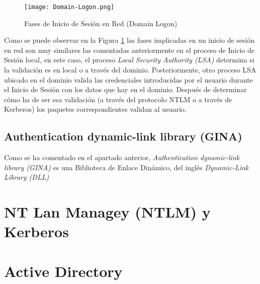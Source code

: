 \begin{figure}[t!] %
\begin{center}
\texttt{[image: Domain-Logon.png]}
\end{center}
\caption{Fases de Inicio de Sesión en Red (Domain Logon)}
\label{domain-logon}
\end{figure}
Como se puede observar en la Figura \ref{domain-logon} las fases implicadas en un inicio de sesión en red son muy similares las comentadas anteriormente en el proceso de Inicio de Sesión local, en este caso, el proceso {\it Local Security Authority (LSA)} determina si la validación es en local o a través del dominio. Posteriormente, otro proceso LSA ubicado en el dominio valida las credenciales introducidas por el usuario durante el Inicio de Sesión con los datos que hay en el dominio. Después de determinar cómo ha de ser esa validación (a través del protocolo NTLM o a través de Kerberos) los paquetes correspondientes validan al usuario.\\

\subsection{Authentication dynamic-link library (GINA)}

Como se ha comentado en el apartado anterior, {\it Authentication dynamic-link library (GINA)} es una Biblioteca de Enlace Dinámico, del inglés {\it Dynamic-Link Library (DLL)} 



\section{NT Lan Managey (NTLM) y Kerberos}

\section{Active Directory}

